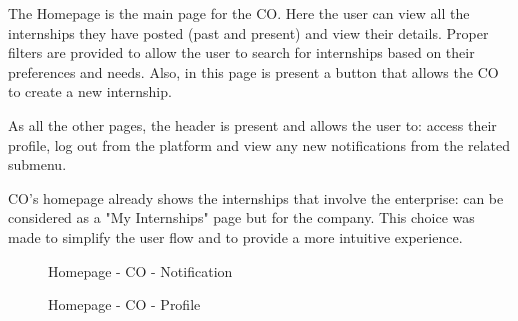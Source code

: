 \par The Homepage is the main page for the CO. Here the user can view all the internships they have posted (past and
present) and view their details. Proper filters are provided to allow the user to search for internships based on
their preferences and needs. Also, in this page is present a button that allows the CO to create a new internship.

\par As all the other pages, the header is present and allows the user to: access their profile, log out from the
platform and view any new notifications from the related submenu.

\par CO's homepage already shows the internships that involve the enterprise: can be considered as a "My Internships" page
but for the company. This choice was made to simplify the user flow and to provide a more intuitive experience.

\begin{figure}[H]
    \centering
    \caption{Homepage - CO - Notification}
    \label{fig:homepage-co-notification}
\end{figure}

\begin{figure}[H]
    \centering
    \caption{Homepage - CO - Profile}
    \label{fig:homepage-co-profile}
\end{figure}

